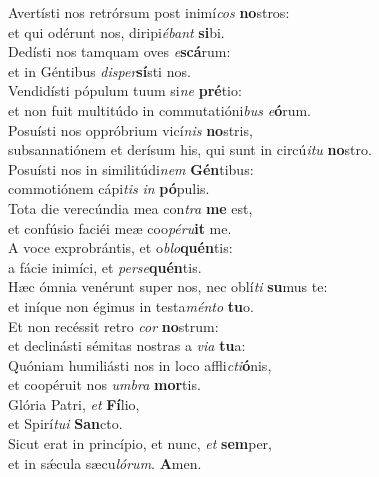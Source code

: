 \evenverse Avertísti nos retrórsum post inimí\textit{cos} \textbf{no}stros:~\*\\
\evenverse et qui odérunt nos, diripi\textit{é}\textit{bant} \textbf{si}bi.\\
\oddverse Dedísti nos tamquam oves \textit{e}\textbf{scá}rum:~\*\\
\oddverse et in Géntibus \textit{di}\textit{sper}\textbf{sí}sti nos.\\
\evenverse Vendidísti pópulum tuum si\textit{ne} \textbf{pré}tio:~\*\\
\evenverse et non fuit multitúdo in commutatióni\textit{bus} \textit{e}\textbf{ó}rum.\\
\oddverse Posuísti nos oppróbrium vicí\textit{nis} \textbf{no}stris,~\*\\
\oddverse subsannatiónem et derísum his, qui sunt in circú\textit{i}\textit{tu} \textbf{no}stro.\\
\evenverse Posuísti nos in similitúdi\textit{nem} \textbf{Gén}tibus:~\*\\
\evenverse commotiónem cápi\textit{tis} \textit{in} \textbf{pó}pulis.\\
\oddverse Tota die verecúndia mea con\textit{tra} \textbf{me} est,~\*\\
\oddverse et confúsio faciéi meæ coo\textit{pé}\textit{ru}\textbf{it} me.\\
\evenverse A voce exprobrántis, et o\textit{blo}\textbf{quén}tis:~\*\\
\evenverse a fácie inimíci, et \textit{per}\textit{se}\textbf{quén}tis.\\
\oddverse Hæc ómnia venérunt super nos, nec oblí\textit{ti} \textbf{su}mus te:~\*\\
\oddverse et iníque non égimus in testa\textit{mén}\textit{to} \textbf{tu}o.\\
\evenverse Et non recéssit retro \textit{cor} \textbf{no}strum:~\*\\
\evenverse et declinásti sémitas nostras a \textit{vi}\textit{a} \textbf{tu}a:\\
\oddverse Quóniam humiliásti nos in loco affli\textit{cti}\textbf{ó}nis,~\*\\
\oddverse et coopéruit nos \textit{um}\textit{bra} \textbf{mor}tis.\\
\evenverse Glória Patri, \textit{et} \textbf{Fí}lio,~\*\\
\evenverse et Spirí\textit{tu}\textit{i} \textbf{San}cto.\\
\oddverse Sicut erat in princípio, et nunc, \textit{et} \textbf{sem}per,~\*\\
\oddverse et in sǽcula sæcu\textit{ló}\textit{rum}. \textbf{A}men.\\
